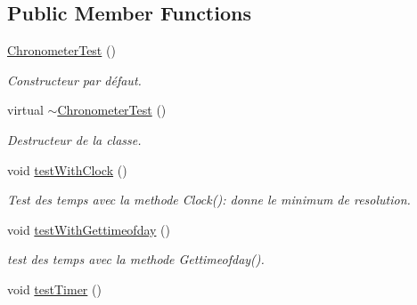 \subsection*{Public Member Functions}
\begin{DoxyCompactItemize}
\item 
\mbox{\label{classtest_1_1ChronometerTest_a6367134c9b042cb401f264685e8454ab}} 
\hyperlink{classtest_1_1ChronometerTest_a6367134c9b042cb401f264685e8454ab}{Chronometer\+Test} ()
\begin{DoxyCompactList}\small\item\em Constructeur par défaut. \end{DoxyCompactList}\item 
\mbox{\label{classtest_1_1ChronometerTest_a2b26983d5be4911605a30d1fa399d22f}} 
virtual \hyperlink{classtest_1_1ChronometerTest_a2b26983d5be4911605a30d1fa399d22f}{$\sim$\+Chronometer\+Test} ()
\begin{DoxyCompactList}\small\item\em Destructeur de la classe. \end{DoxyCompactList}\item 
\mbox{\label{classtest_1_1ChronometerTest_a72170c35464a09e09ef33bbd895060f6}} 
void \hyperlink{classtest_1_1ChronometerTest_a72170c35464a09e09ef33bbd895060f6}{test\+With\+Clock} ()
\begin{DoxyCompactList}\small\item\em Test des temps avec la methode Clock()\+: donne le minimum de resolution. \end{DoxyCompactList}\item 
\mbox{\label{classtest_1_1ChronometerTest_ae3e1f155b3e0e1a967c901bac09ea9aa}} 
void \hyperlink{classtest_1_1ChronometerTest_ae3e1f155b3e0e1a967c901bac09ea9aa}{test\+With\+Gettimeofday} ()
\begin{DoxyCompactList}\small\item\em test des temps avec la methode Gettimeofday(). \end{DoxyCompactList}\item 
\mbox{\label{classtest_1_1ChronometerTest_aafd32c4f0f915a4b707fc420c0becc15}} 
void \hyperlink{classtest_1_1ChronometerTest_aafd32c4f0f915a4b707fc420c0becc15}{test\+Timer} ()

\end{DoxyCompactItemize}
